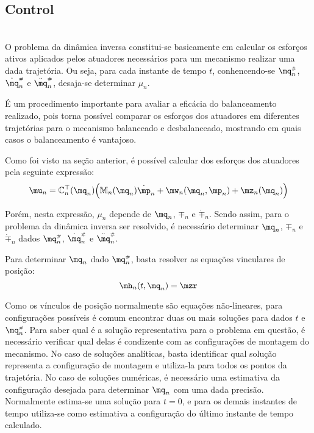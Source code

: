 \subsection{Control}\label{S03-2}

\\

O problema da din\^amica inversa constitui-se basicamente em calcular os esfor\c{c}os ativos aplicados pelos atuadores necess\'arios para um mecanismo realizar uma dada trajet\'oria. Ou seja, para cada instante de tempo $t$, conhencendo-se $\mq_n\ssh$, $\dot{\mq}_n\ssh$ e $\ddot{\mq}_n\ssh$, desaja-se determinar $\mu_n$.

\'E um procedimento importante para avaliar a efic\'acia do balanceamento realizado, pois torna poss\'ivel comparar os esfor\c{c}os dos atuadores em diferentes trajet\'orias para o mecanismo balanceado e desbalanceado, mostrando em quais casos o balanceamento \'e vantajoso.

Como foi visto na se\c{c}\~ao anterior, \'e poss\'ivel calcular dos esfor\c{c}os dos atuadores pela seguinte express\~ao:
\begin{equation} \label{eq:InverseDynamics}
\mu_n = \mC_n^\top(\mq_n) \Big( \mM_n(\mq_n) \dot{\mp}_n + \mw_n(\mq_n, \mp_n) + \mz_n(\mq_n) \Big)
\end{equation}

Por\'em, nesta express\~ao, $\mu_n$ depende de $\mq_n$, $\mp_n$ e $\dot{\mp}_n$. Sendo assim, para o problema da din\^amica inversa ser resolvido, \'e necess\'ario determinar $\mq_n$, $\mp_n$ e $\dot{\mp}_n$ dados $\mq_n\ssh$, $\dot{\mq}_n\ssh$ e $\ddot{\mq}_n\ssh$.

Para determinar $\mq_n$ dado $\mq_n\ssh$, basta resolver as equa\c{c}\~oes vinculares de posi\c{c}\~ao: 
\begin{equation} \label{eq:PositionConstraints}
\mh_n(t, \mq_n) = \mzr
\end{equation}


Como os v\'inculos de posi\c{c}\~ao normalmente s\~ao equa\c{c}\~oes n\~ao-lineares, para configura\c{c}\~oes poss\'iveis \'e comum encontrar duas ou mais solu\c{c}\~oes para dados $t$ e $\mq_n\ssh$. Para saber qual \'e a solu\c{c}\~ao representativa para o problema em quest\~ao, \'e necess\'ario verificar qual delas \'e condizente com as configura\c{c}\~oes de montagem do mecanismo. No caso de solu\c{c}\~oes anal\'iticas, basta identificar qual solu\c{c}\~ao representa a configura\c{c}\~ao de montagem e utiliza-la para todos os pontos da trajet\'oria. No caso de solu\c{c}\~oes num\'ericas, \'e necess\'ario uma estimativa da configura\c{c}\~ao desejada para determinar $\mq_n$ com uma dada precis\~ao. Normalmente estima-se uma solu\c{c}\~ao para $t=0$, e para os demais instantes de tempo utiliza-se como estimativa a configura\c{c}\~ao do \'ultimo instante de tempo calculado. \\

